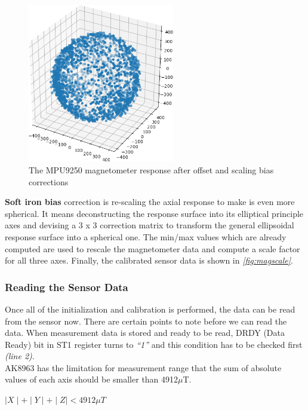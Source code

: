 \documentclass[a4paper,12pt,oneside]{book}
\begin{document}
\begin{figure}[!htb]
\centering
\includegraphics[width=0.57\textwidth]{images/scaled}
\caption{The MPU9250 magnetometer response after offset and scaling bias corrections}
\label{fig:magscale}
\end{figure}

\clearpage
\textbf{Soft iron bias} correction is re-scaling the axial response to make is even more spherical. It means deconstructing the response surface into its elliptical principle axes and devising a 3 x 3 correction matrix to transform the general ellipsoidal response surface into a spherical one. The min/max values which are already computed are used to rescale the magnetometer data and compute a scale factor for all three axes. Finally, the calibrated sensor data is shown in \textit{\autoref{fig:magscale}}.\cite{kris}\\

\subsubsection{Reading the Sensor Data}
Once all of the initialization and calibration is performed, the data can be read from the sensor now. There are certain points to note before we can read the data. When measurement data is stored and ready to be read, DRDY (Data Ready) bit in ST1 register turns to \textit{“1”} and this condition has to be checked first \textit{(line 2)}.\\

AK8963 has the limitation for measurement range that the sum of absolute values of each axis should be smaller than 4912$\mu$T.

\begin{center}
$\mid X \mid + \mid Y \mid + \mid Z \mid  <  4912 \mu T$
\end{center}
\end{document}
